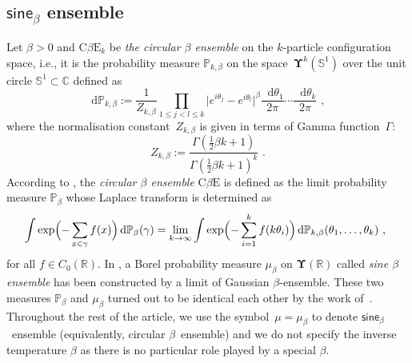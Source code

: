 \documentclass[11pt,letterpaper]{amsart}
\newcommand{\diff}{\mathop{}\!\mathrm{d}}
\newcommand{\R}{{\mathbb R}}
\newcommand{\comma}{\,\,\mathrm{,}\;\,}
\newcommand{\fstop}{\,\,\mathrm{.}}
\newcommand{\QP}{{\mu}}
\newcommand{\dUpsilon}{{\mathbf \Upsilon}}
\newcommand{\U}{\dUpsilon}
\newcommand{\sine}{\mathsf{sine}}
\renewcommand{\1}{\mathbf 1}
\numberwithin{equation}{section}
\theoremstyle{plain}
\theoremstyle{definition}
\newtheorem{defs}[thm]{Definition}%
\theoremstyle{remark}
\newcommand{\CBE}{\mathrm{C}\beta\mathrm{E}}
\begin{document}
\subsection{$\sine_\beta$ ensemble} \label{subsec:SB}
Let $\beta>0$ and $\CBE_k$ be {\it the circular $\beta$ ensemble} on the $k$-particle configuration space, i.e., it is the probability measure $\mathbb P_{k, \beta}$ on the space~$\U^k(\mathbb S^1)$ over the unit circle $\mathbb S^1 \subset \mathbb C$ defined as
$$\diff \mathbb P_{k, \beta} := \frac{1}{Z_{k, \beta}}\prod_{1 \le j<l \le k}\bigl| e^{i\theta_j}- e^{i\theta_l}\bigr|^\beta\frac{\diff \theta_1}{2\pi} \cdots\frac{\diff \theta_k}{2\pi} \comma$$
where the normalisation constant~$Z_{k, \beta}$ is given in terms of Gamma function~$\Gamma$:
$$Z_{k, \beta}:=\frac{\Gamma(\frac{1}{2}\beta k +1)}{\Gamma(\frac{1}{2}\beta k +1)^k} \fstop$$
According to \cite[Def.\ 1.6]{KilSto09}, the {\it circular $\beta$ ensemble} $\CBE$  is defined as the limit probability measure $\mathbb P_{\beta}$ whose Laplace transform is determined as 
$$\int \exp\Bigl(-\sum_{x \in \gamma} f(x) \Bigr) \diff \mathbb P_{\beta}(\gamma) = \lim_{k \to \infty} \int \exp\Bigl( - \sum_{i=1}^kf(k \theta_i)\Bigr) \diff \mathbb P_{k ,\beta}(\theta_1, \ldots, \theta_k) \comma$$
for all $f \in C_0(\R)$.
In \cite{ValVir09}, a Borel probability measure $\mu_\beta$ on $\U(\R)$ called {\it sine $\beta$ ensemble} has been constructed by a limit of Gaussian $\beta$-ensemble. These two measures $\mathbb P_\beta$ and $\mu_\beta$ turned out to be identical each other by the work of~\cite{Nak14}. Throughout the rest of the article, we use the symbol~$\QP=\mu_\beta$ to denote $\sine_\beta$~ensemble (equivalently, circular $\beta$~ensemble) and we do not specify the inverse temperature $\beta$ as there is no particular role played by a special $\beta$. 



\smallskip
\end{document}
